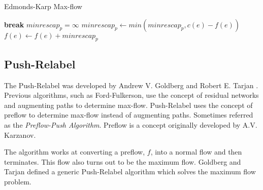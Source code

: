 \begin{algorithm}[!t]
	\caption{Edmonds-Karp Max-flow}\label{alg:dinic}
	\begin{algorithmic}[1]
			\State \textbf{break}
			\EndIf
			\newline
			\State $minrescap_p = \infty$
			\State $minrescap_p \gets min(minrescap_p,c(e)-f(e))$
			\EndFor
			\newline
			\State $f(e) \gets f(e) + minrescap_p$
			\EndFor
			\EndWhile\label{dinicwhile}
		\EndProcedure
	\end{algorithmic}
\end{algorithm}


\subsection{Push-Relabel}
\label{sec:PushRelabel}

The Push-Relabel was developed by Andrew V. Goldberg and Robert E. Tarjan \cite{Goldberg1988}. Previous algorithms, such as Ford-Fulkerson, use the concept of residual networks and augmenting paths to determine max-flow.
Push-Relabel uses the concept of preflow to determine  max-flow instead of augmenting paths. Sometimes referred as the \textit{Preflow-Push Algorithm}.
Preflow is a concept originally developed by A.V. Karzanov.

The algorithm works at converting a preflow, $f$, into a normal flow and then terminates. This flow also turns out to be the maximum flow. Goldberg and Tarjan defined a generic Push-Relabel algorithm  which solves the maximum flow problem.

